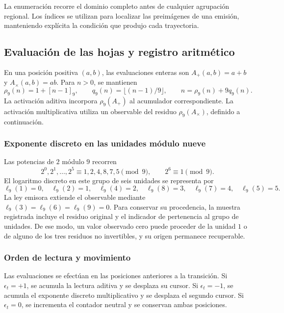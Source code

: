 La enumeración recorre el dominio completo antes de cualquier agrupación
regional. Los índices se utilizan para localizar las preimágenes de una
emisión, manteniendo explícita la condición que produjo cada trayectoria.

\subsection{Evaluación de las hojas y registro aritmético}
\label{act21:tpk:lecturas}

En una posición positiva \((a,b)\), las evaluaciones enteras son
\(A_+(a,b)=a+b\) y \(A_\times(a,b)=ab\). Para \(n>0\), se mantienen
\begin{equation}
 \rho_9(n)=1+[n-1]_9,\qquad
 q_9(n)=\lfloor(n-1)/9\rfloor,\qquad
 n=\rho_9(n)+9q_9(n).
 \label{act21:tpk:division-evaluacion}
\end{equation}
La activación aditiva incorpora \(\rho_9(A_+)\) al acumulador
correspondiente. La activación multiplicativa utiliza un observable del
residuo \(\rho_9(A_\times)\), definido a continuación.

\subsubsection{Exponente discreto en las unidades módulo nueve}

Las potencias de \(2\) módulo \(9\) recorren
\[
 2^0,2^1,\ldots,2^5\equiv1,2,4,8,7,5\pmod9,
 \qquad 2^6\equiv1\pmod9.
\]
El logaritmo discreto en este grupo de seis unidades se representa por
\begin{equation}
 \ell_9(1)=0,\quad\ell_9(2)=1,\quad\ell_9(4)=2,
 \quad\ell_9(8)=3,\quad\ell_9(7)=4,\quad\ell_9(5)=5.
 \label{act21:tpk:logaritmo}
\end{equation}
La ley emisora extiende el observable mediante
\(\ell_9(3)=\ell_9(6)=\ell_9(9)=0\). Para conservar su procedencia, la
muestra registrada incluye el residuo original y el indicador de pertenencia
al grupo de unidades. De ese modo, un valor observado cero puede proceder
de la unidad \(1\) o de alguno de los tres residuos no invertibles, y su
origen permanece recuperable.

\subsubsection{Orden de lectura y movimiento}

Las evaluaciones se efectúan en las posiciones anteriores a la transición.
Si \(\epsilon_t=+1\), se acumula la lectura aditiva y se desplaza su cursor.
Si \(\epsilon_t=-1\), se acumula el exponente discreto multiplicativo y se
desplaza el segundo cursor. Si \(\epsilon_t=0\), se incrementa el contador
neutral y se conservan ambas posiciones.

